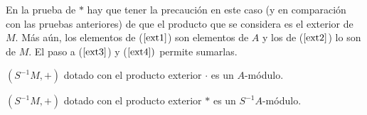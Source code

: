 \documentclass[../main.tex]{subfiles}
\begin{document}
\begin{remark}
\begin{remark}
	En la prueba de $*$ hay que tener la precaución en este caso (y en comparación con las pruebas anteriores) de que el producto que se considera es el exterior de $M$. Más aún, los elementos de ($\ref{ext1}$) son elementos de $A$ y los de ($\ref{ext2}$) lo son de $M$. El paso a ($\ref{ext3}$) y ($\ref{ext4})$ permite sumarlas.
\end{remark}

\begin{proposition}
	$(S^{-1}M,+)$ dotado con el producto exterior $·$ es un $A$-módulo.
\end{proposition}

\begin{proposition}
	$(S^{-1}M,+)$ dotado con el producto exterior $*$ es un $S^{-1}A$-módulo.
\end{proposition}
\end{remark}
\end{document}
